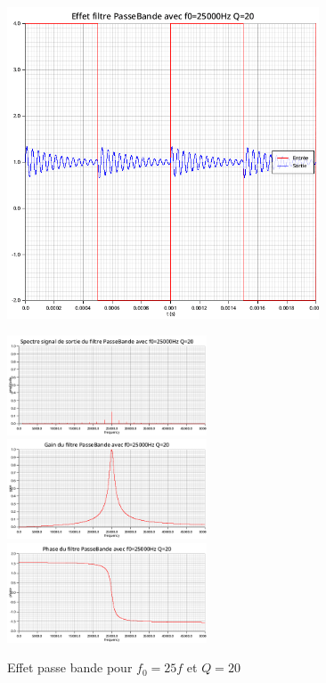 \documentclass{article}
\begin{document}
\begin{figure}[H]
  \begin{minipage}{0.6\textwidth}
      \centering
      \includegraphics[width=25em]{images/creneau/bande/q=20/25/signals.png}
  \end{minipage}
  \begin{minipage}{0.3\textwidth}
      \centering
      \includegraphics[width=16em]{images/creneau/bande/q=20/25/fft_out.png}
      \vfill
      \includegraphics[width=16em]{images/creneau/bande/q=20/25/gain.png}
      \vfill
      \includegraphics[width=16em]{images/creneau/bande/q=20/25/phase.png}
  \end{minipage}
  \caption{Effet passe bande pour $f_0=25f$ et $Q=20$}
\end{figure}
\end{document}

